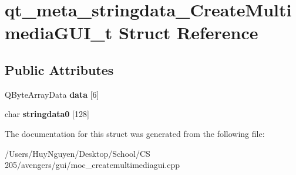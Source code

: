 \hypertarget{structqt__meta__stringdata__CreateMultimediaGUI__t}{}\section{qt\+\_\+meta\+\_\+stringdata\+\_\+\+Create\+Multimedia\+G\+U\+I\+\_\+t Struct Reference}
\label{structqt__meta__stringdata__CreateMultimediaGUI__t}
\subsection*{Public Attributes}
\begin{DoxyCompactItemize}
\item 
Q\+Byte\+Array\+Data {\bfseries data} \mbox{[}6\mbox{]}\hypertarget{structqt__meta__stringdata__CreateMultimediaGUI__t_a8bc75071774bd713841f7572e6fb3c6e}{}\label{structqt__meta__stringdata__CreateMultimediaGUI__t_a8bc75071774bd713841f7572e6fb3c6e}

\item 
char {\bfseries stringdata0} \mbox{[}128\mbox{]}\hypertarget{structqt__meta__stringdata__CreateMultimediaGUI__t_a654b9f94c36ffad395a8c6411df3dda5}{}\label{structqt__meta__stringdata__CreateMultimediaGUI__t_a654b9f94c36ffad395a8c6411df3dda5}

\end{DoxyCompactItemize}


The documentation for this struct was generated from the following file\+:\begin{DoxyCompactItemize}
\item 
/\+Users/\+Huy\+Nguyen/\+Desktop/\+School/\+C\+S 205/avengers/gui/moc\+\_\+createmultimediagui.\+cpp\end{DoxyCompactItemize}
